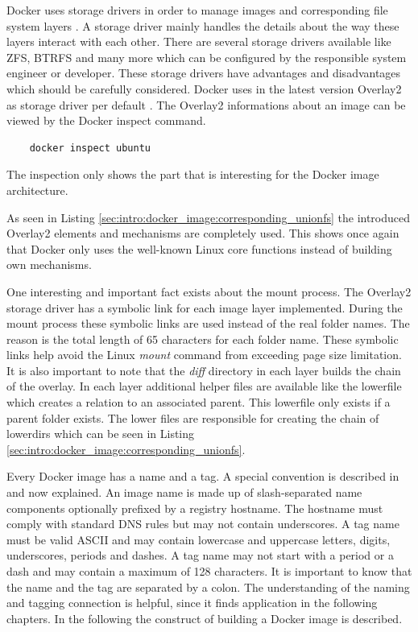 Docker uses storage drivers in order to manage images and corresponding file system layers \cite{docker_storage_driver}. 
A storage driver mainly handles the details about the way these layers interact with each other.
There are several storage drivers available like ZFS, BTRFS and many more which can be configured by the responsible system engineer or developer. 
These storage drivers have advantages and disadvantages which should be carefully considered. 
Docker uses in the latest version Overlay2 as storage driver per default \cite{docker_storage_driver}. 
The Overlay2 informations about an image can be viewed by the Docker inspect command.
\begin{lstlisting}
	docker inspect ubuntu
\end{lstlisting}
The inspection only shows the part that is interesting for the Docker image architecture.

As seen in Listing \ref{sec:intro:docker_image:corresponding_unionfs} the introduced Overlay2 elements and mechanisms are completely used.
This shows once again that Docker only uses the well-known Linux core functions instead of building own mechanisms.

One interesting and important fact exists about the mount process.
The Overlay2 storage driver has a symbolic link for each image layer implemented. 
During the mount process these symbolic links are used instead of the real folder names. 
The reason is the total length of 65 characters for each folder name. 
These symbolic links help avoid the Linux \textit{mount} command from exceeding page size limitation.
It is also important to note that the \textit{diff} directory in each layer builds the chain of the overlay. 
In each layer additional helper files are available like the lowerfile which creates a relation to an associated parent. 
This lowerfile only exists if a parent folder exists. 
The lower files are responsible for creating the chain of lowerdirs which can be seen in Listing \ref{sec:intro:docker_image:corresponding_unionfs}.

Every Docker image has a name and a tag. A special convention is described in \cite{docker_tag} and now explained. 
An image name is made up of slash-separated name components optionally prefixed by a registry hostname. 
The hostname must comply with standard DNS rules but may not contain underscores. 
A tag name must be valid ASCII and may contain lowercase and uppercase letters, digits, underscores, periods and dashes. 
A tag name may not start with a period or a dash and may contain a maximum of 128 characters.
It is important to know that the name and the tag are separated by a colon.
The understanding of the naming and tagging connection is helpful, since it finds application in the following chapters.
In the following the construct of building a Docker image is described.

